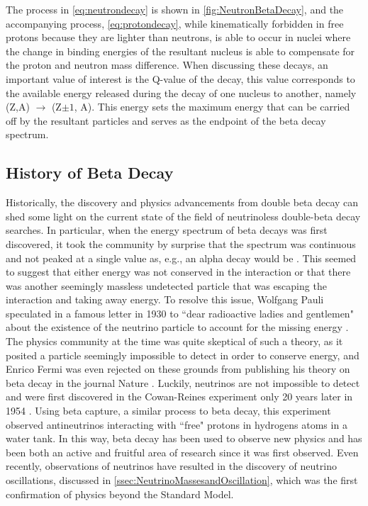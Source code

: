 The process in \autoref{eq:neutrondecay} is shown in \autoref{fig:NeutronBetaDecay}, and the accompanying process, \autoref{eq:protondecay}, while kinematically forbidden in free protons because they are lighter than neutrons, is able to occur in nuclei where the change in binding energies of the resultant nucleus is able to compensate for the proton and neutron mass difference. When discussing these decays, an important value of interest is the Q-value of the decay, this value corresponds to the available energy released during the decay of one nucleus to another, namely (Z,A) $\rightarrow$ (Z$\pm1$, A). This energy sets the maximum energy that can be carried off by the resultant particles and serves as the endpoint of the beta decay spectrum. 

\subsection{History of Beta Decay}
Historically, the discovery and physics advancements from double beta decay can shed some light on the current state of the field of neutrinoless double-beta decay searches. In particular, when the energy spectrum of beta decays was first discovered, it took the community by surprise that the spectrum was continuous and not peaked at a single value as, e.g., an alpha decay would be \cite{o.vonbayero.hahnl.meitner}. This seemed to suggest that either energy was not conserved in the interaction or that there was another seemingly massless undetected particle that was escaping the interaction and taking away energy. To resolve this issue, Wolfgang Pauli speculated in a famous letter in 1930 to ``dear radioactive ladies and gentlemen" about the existence of the neutrino particle to account for the missing energy \cite{pauli_1930}. The physics community at the time was quite skeptical of such a theory, as it posited a particle seemingly impossible to detect in order to conserve energy, and Enrico Fermi was even rejected on these grounds from publishing his theory on beta decay in the journal Nature \cite{fermi_1934}. Luckily, neutrinos are not impossible to detect and were first discovered in the Cowan-Reines experiment only 20 years later in 1954 \cite{PhysRev.92.830}. Using beta capture, a similar process to beta decay, this experiment observed antineutrinos interacting with ``free" protons in hydrogens atoms in a water tank. In this way, beta decay has been used to observe new physics and has been both an active and fruitful area of research since it was first observed. Even recently, observations of neutrinos have resulted in the discovery of neutrino oscillations, discussed in \autoref{ssec:NeutrinoMassesandOscillation}, which was the first confirmation of physics beyond the Standard Model.


